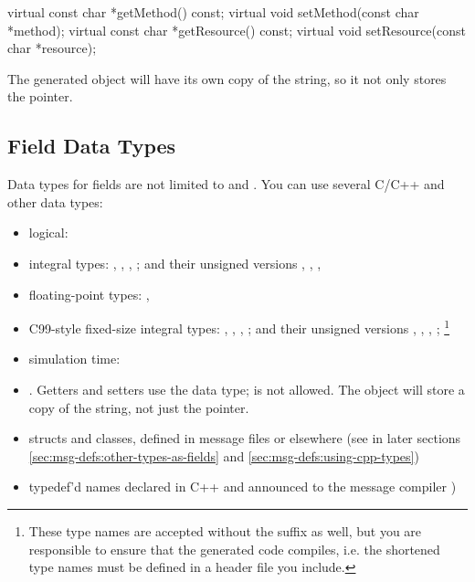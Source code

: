 \begin{cpp}
virtual const char *getMethod() const;
virtual void setMethod(const char *method);
virtual const char *getResource() const;
virtual void setResource(const char *resource);
\end{cpp}

The generated object will have its own copy of the string, so it not only stores
the  pointer.


\subsection{Field Data Types}
\label{sec:msg-defs:field-data-types}

Data types for fields are not limited to  and
. You can use several C/C++ and other data types:

\begin{itemize}
   \item logical: 
   \item integral types: , , ,
      ; and their unsigned versions ,
      , , 
   \item floating-point types: , 
   \item C99-style fixed-size integral types: , ,
      , ; and their unsigned versions
      , , , ;
      \footnote{These type names are accepted without the  suffix as well,
      but you are responsible to ensure that the generated code compiles, i.e. the
      shortened type names must be defined in a header file you include.}
   \item {\opp} simulation time: 
   \item {}. Getters and setters use the  data type;
       is not allowed. The object will store a copy of the string,
      not just the pointer.
   \item structs and classes, defined in message files or elsewhere (see
      in later sections \ref{sec:msg-defs:other-types-as-fields}
      and \ref{sec:msg-defs:using-cpp-types})
   \item typedef'd names declared in C++ and announced to the message compiler
)
\end{itemize}

